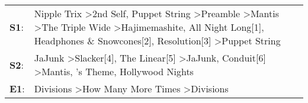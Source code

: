 \begin{supertabular}{p{0.03\textwidth}p{0.92\textwidth}}
 \textbf{S1}:  &  Nipple Trix\textsuperscript{} \textgreater \enspace 2nd Self\textsuperscript{}, \enspace Puppet String\textsuperscript{} \textgreater \enspace Preamble\textsuperscript{} \textgreater \enspace Mantis\textsuperscript{} \textgreater \enspace The Triple Wide\textsuperscript{} \textgreater \enspace Hajimemashite\textsuperscript{}, \enspace All Night Long[1]\textsuperscript{}, \enspace Headphones \& Snowcones[2]\textsuperscript{}, \enspace Resolution[3]\textsuperscript{} \textgreater \enspace Puppet String\textsuperscript{}  \enspace  \\
 \textbf{S2}:  &                                                                                                                                                                                               JaJunk\textsuperscript{} \textgreater \enspace Slacker[4]\textsuperscript{}, \enspace The Linear[5]\textsuperscript{} \textgreater \enspace JaJunk\textsuperscript{}, \enspace Conduit[6]\textsuperscript{} \textgreater \enspace Mantis\textsuperscript{}, 's Theme\textsuperscript{}, \enspace Hollywood Nights\textsuperscript{}  \enspace  \\
 \textbf{E1}:  &                                                                                                                                                                                                                                                                                                                                                                                                    Divisions\textsuperscript{} \textgreater \enspace How Many More Times\textsuperscript{} \textgreater \enspace Divisions\textsuperscript{}  \enspace  \\
\end{supertabular}
